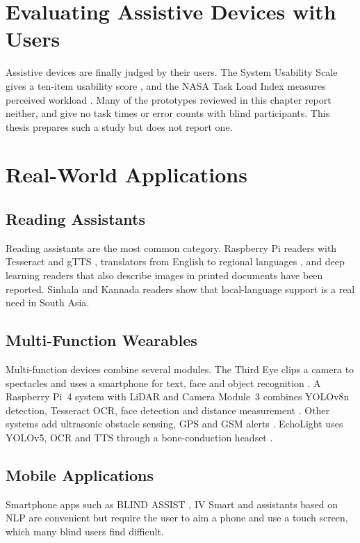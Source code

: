 \section{Evaluating Assistive Devices with Users}
\label{sec:user_lit}
Assistive devices are finally judged by their users. The System Usability Scale gives a ten-item usability score \cite{sus}, and the NASA Task Load Index measures perceived workload \cite{nasatlx}. Many of the prototypes reviewed in this chapter report neither, and give no task times or error counts with blind participants. This thesis prepares such a study but does not report one.

\section{Real-World Applications}
\label{sec:applications}

\subsection{Reading Assistants}
Reading assistants are the most common category. Raspberry Pi readers with Tesseract and gTTS \cite{readingaid_rpi2023, visionvoice2024, cameraocr2023}, translators from English to regional languages \cite{readingaid_rpi2023}, and deep learning readers that also describe images in printed documents \cite{dlreader2022} have been reported. Sinhala and Kannada readers \cite{visioguide2025} show that local-language support is a real need in South Asia.

\subsection{Multi-Function Wearables}
Multi-function devices combine several modules. The Third Eye clips a camera to spectacles and uses a smartphone for text, face and object recognition \cite{thirdeye2019}. A Raspberry Pi~4 system with LiDAR and Camera Module~3 combines YOLOv8n detection, Tesseract OCR, face detection and distance measurement \cite{aiblind2025}. Other systems add ultrasonic obstacle sensing, GPS and GSM alerts \cite{navassist2024, smartglass_vip2025, obstacle_rpi2020}. EchoLight uses YOLOv5, OCR and TTS through a bone-conduction headset \cite{echolight2025}.

\subsection{Mobile Applications}
Smartphone apps such as BLIND ASSIST \cite{blindassist2021}, IV Smart \cite{ivsmart2024} and assistants based on NLP \cite{ai_nlp2025} are convenient but require the user to aim a phone and use a touch screen, which many blind users find difficult.

